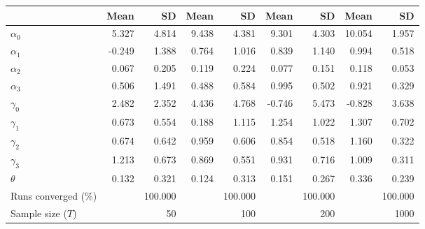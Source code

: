 
\begin{tabular}[t]{lrrrrrrrr}
\toprule
  & Mean & SD & Mean  & SD  & Mean   & SD   & Mean    & SD   \\
\midrule
$\alpha_{0}$ & 5.327 & 4.814 & 9.438 & 4.381 & 9.301 & 4.303 & 10.054 & 1.957\\
$\alpha_{1}$ & -0.249 & 1.388 & 0.764 & 1.016 & 0.839 & 1.140 & 0.994 & 0.518\\
$\alpha_{2}$ & 0.067 & 0.205 & 0.119 & 0.224 & 0.077 & 0.151 & 0.118 & 0.053\\
$\alpha_{3}$ & 0.506 & 1.491 & 0.488 & 0.584 & 0.995 & 0.502 & 0.921 & 0.329\\
$\gamma_{0}$ & 2.482 & 2.352 & 4.436 & 4.768 & -0.746 & 5.473 & -0.828 & 3.638\\
$\gamma_{1}$ & 0.673 & 0.554 & 0.188 & 1.115 & 1.254 & 1.022 & 1.307 & 0.702\\
$\gamma_{2}$ & 0.674 & 0.642 & 0.959 & 0.606 & 0.854 & 0.518 & 1.160 & 0.322\\
$\gamma_{3}$ & 1.213 & 0.673 & 0.869 & 0.551 & 0.931 & 0.716 & 1.009 & 0.311\\
$\theta$ & 0.132 & 0.321 & 0.124 & 0.313 & 0.151 & 0.267 & 0.336 & 0.239\\
Runs converged (\%) &  & 100.000 &  & 100.000 &  & 100.000 &  & 100.000\\
Sample size ($T$) &  & 50 &  & 100 &  & 200 &  & 1000\\
\bottomrule
\end{tabular}
